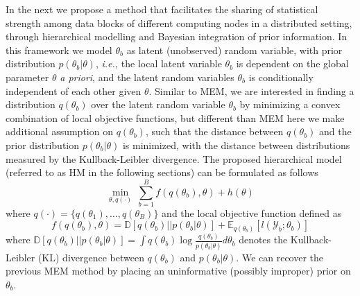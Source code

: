 \documentclass{article}
\newcommand{\ie}[0]{\emph{i.e., }}
\newcommand{\1}[0]{\ensuremath{\boldsymbol{1}}\xspace}
\begin{document}
In the next we propose a method that facilitates the sharing of statistical strength among data blocks of different computing nodes in a distributed setting, through hierarchical modelling and Bayesian integration of prior information. In this framework we model $\theta_b$ as latent (unobserved) random variable, with prior distribution $p(\theta_b | \theta)$, \ie the local latent variable $\theta_b$ is dependent on the global parameter $\theta$ \emph{a priori}, and the latent random variables $\theta_b$ is conditionally independent of each other given $\theta$. Similar to MEM, we are interested in finding a distribution $q(\theta_b)$ over the latent random variable $\theta_b$ by minimizing a convex combination of local objective functions, but different than MEM here we make additional assumption on $q(\theta_b)$, such that the distance between $q(\theta_b)$ and the prior distribution $p(\theta_b|\theta)$ is minimized, with the distance between distributions measured by the Kullback-Leibler divergence.  The proposed hierarchical model (referred to as HM in the following sections) can be formulated as follows
\begin{equation}\label{hm}
\textstyle \min_{\theta, q(\cdot)} ~ \sum_{b=1}^B f(q(\theta_b), \theta) + h(\theta)
\end{equation}
where $q(\cdot) = \{q(\theta_1), \ldots, q(\theta_B)\}$ and the local objective function defined as
\begin{equation}\label{local_obj}
f(q(\theta_b), \theta)  = \mathbb{D}[q(\theta_b)||p(\theta_b|\theta)] + \mathbb{E}_{q(\theta_b)}[l(\mathcal{Y}_b; \theta_b)]
\end{equation}
where $\mathbb{D}[q(\theta_b)||p(\theta_b|\theta)] = \int q(\theta_b)\log\frac{q(\theta_b)}{p(\theta_b|\theta)}d\theta_b$ denotes the Kullback-Leibler (KL) divergence between $q(\theta_b)$ and $p(\theta_b|\theta)$. We can recover the previous MEM method by placing an uninformative (possibly improper) prior on $\theta_b$. 
\end{document}
